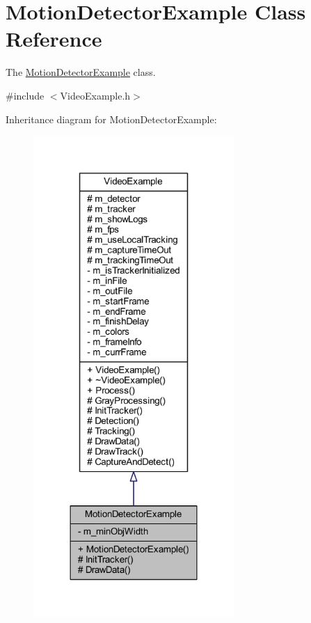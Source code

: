 \hypertarget{class_motion_detector_example}{}\section{Motion\+Detector\+Example Class Reference}
\label{class_motion_detector_example}


The \mbox{\hyperlink{class_motion_detector_example}{Motion\+Detector\+Example}} class.  




{\ttfamily \#include $<$Video\+Example.\+h$>$}



Inheritance diagram for Motion\+Detector\+Example\+:\nopagebreak
\begin{figure}[H]
\begin{center}
\leavevmode
\includegraphics[width=216pt]{class_motion_detector_example__inherit__graph}
\end{center}
\end{figure}


